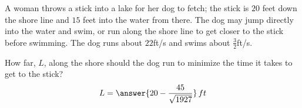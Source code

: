 \documentclass{ximera}
\author{Gregory Hartman \and Matthew Carr}
\begin{document}
\begin{exercise}




A woman throws a stick into a lake for her dog to fetch; the stick is $20$ feet down the shore line and $15$ feet into the water from there. The dog may jump directly into the water and swim, or run along the shore line to get closer to the stick before swimming. The dog runs about $22$ft/s and swims about $\frac{3}{2}$ft/s. 

How far, $L$, along the shore should the dog run to minimize the time it takes to get to the stick? \[L=\answer{20-\frac{45}{\sqrt{1927}}}\,ft\]




\end{exercise}
\end{document}
